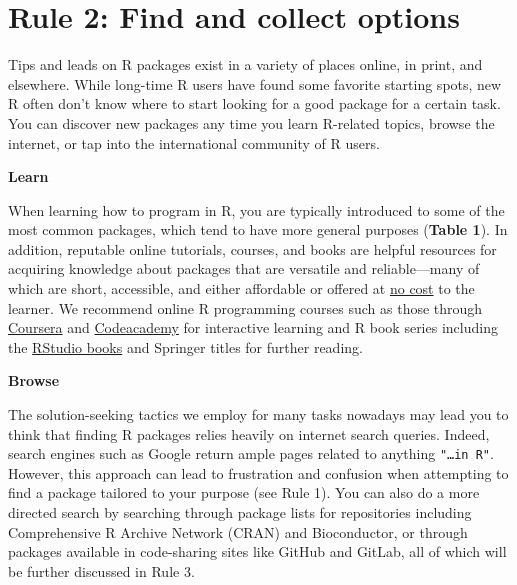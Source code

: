 \documentclass[10pt,letterpaper]{article}
\begin{document}
\hypertarget{rule-2-find-and-collect-options}{%
\section{Rule 2: Find and collect
options}\label{rule-2-find-and-collect-options}}

Tips and leads on R packages exist in a variety of places online, in
print, and elsewhere. While long-time R users have found some favorite
starting spots, new R often don't know where to start looking for a good
package for a certain task. You can discover new packages any time you
learn R-related topics, browse the internet, or tap into the
international community of R users.

\textbf{Learn}

When learning how to program in R, you are typically introduced to some
of the most common packages, which tend to have more general purposes
(\textbf{Table 1}). In addition, reputable online tutorials, courses,
and books are helpful resources for acquiring knowledge about packages
that are versatile and reliable---many of which are short, accessible,
and either affordable or offered at
\href{https://committedtotape.shinyapps.io/freeR/}{no cost} to the
learner. We recommend online R programming courses such as those through
\href{https://www.coursera.org/learn/r-programming}{Coursera} and
\href{https://www.codecademy.com/learn/learn-r}{Codeacademy} for
interactive learning and R book series including the
\href{https://rstudio.com/resources/books/}{RStudio books} and Springer
titles for further reading.

\textbf{Browse}

The solution-seeking tactics we employ for many tasks nowadays may lead
you to think that finding R packages relies heavily on internet search
queries. Indeed, search engines such as Google return ample pages
related to anything \texttt{"\ldots{}in\ R"}. However, this approach can
lead to frustration and confusion when attempting to find a package
tailored to your purpose (see Rule 1). You can also do a more directed
search by searching through package lists for repositories including
Comprehensive R Archive Network (CRAN) and Bioconductor, or through
packages available in code-sharing sites like GitHub and GitLab, all of
which will be further discussed in Rule 3.
\end{document}

